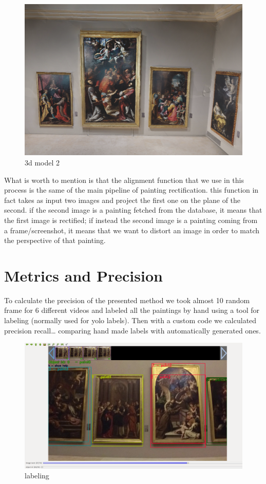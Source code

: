 \documentclass[conference]{IEEEtran}
\begin{document}
\begin{figure}[htbp]
\centerline{\includegraphics[width=0.8\columnwidth]{../screenshots_3d_model/screenshot_03.png}}
\caption{3d model 2}
\label{fig_3d_model_2}
\end{figure}

What is worth to mention is that the alignment function that we use in this process is the same of the main pipeline of painting rectification. this function in fact takes as input two images and project the first one on the plane of the second. if the second image is a painting fetched from the database, it means that the first image is rectified; if instead the second image is a painting coming from a frame/screenshot, it means that we want to distort an image in order to match the perspective of that painting.



\section{Metrics and Precision}
To calculate the precision of the presented method we took almost 10 random frame for 6 different videos and labeled all the paintings by hand using a tool for labeling (normally used for yolo labels). Then with a custom code we calculated precision recall… comparing hand made labels with automatically generated ones.

\begin{figure}[htbp]
\centerline{\includegraphics[width=0.8\columnwidth]{../Labeling_precision_metrics/Precision_Labeling.png}}
\caption{labeling}
\label{fig_labeling}
\end{figure}
\end{document}
